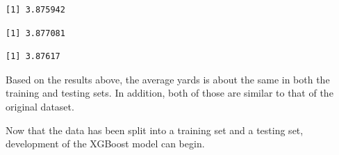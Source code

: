 \documentclass[
  super,
  preprint,
  3p]{elsarticle}
\newenvironment{Shaded}{\begin{snugshade}}{\end{snugshade}}
\newcommand{\FunctionTok}[1]{\textcolor[rgb]{0.28,0.35,0.67}{#1}}
\newcommand{\NormalTok}[1]{\textcolor[rgb]{0.00,0.23,0.31}{#1}}
\newcommand{\OtherTok}[1]{\textcolor[rgb]{0.00,0.23,0.31}{#1}}
\newcommand{\SpecialCharTok}[1]{\textcolor[rgb]{0.37,0.37,0.37}{#1}}
\begin{document}
\begin{verbatim}
[1] 3.875942
\end{verbatim}

\begin{Shaded}
\end{Shaded}

\begin{verbatim}
[1] 3.877081
\end{verbatim}

\begin{Shaded}
\end{Shaded}

\begin{verbatim}
[1] 3.87617
\end{verbatim}

Based on the results above, the average yards is about the same in both
the training and testing sets. In addition, both of those are similar to
that of the original dataset.

Now that the data has been split into a training set and a testing set,
development of the XGBoost model can begin.
\end{document}
